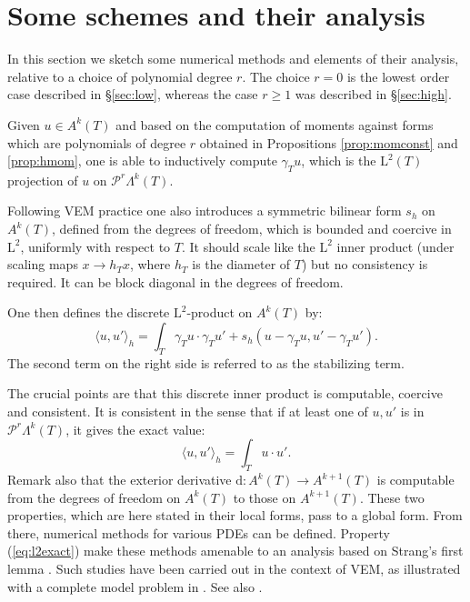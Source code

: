 \documentclass[10pt,a4paper]{article}
\newcommand{\rmd}{\mathrm{d}}
\newcommand{\rmL}{\mathrm{L}}
\newcommand{\calP}{\mathcal{P}}
\newcommand{\Poly}{\calP}
\theoremstyle{remark}
\theoremstyle{definition}
\numberwithin{equation}{section}
\begin{document}
\section{Some schemes and their analysis\label{sec:algo}}
In this section we sketch some numerical methods and elements of their analysis, relative to a choice of polynomial degree $r$. The choice $r=0$ is the lowest order case described in \S \ref{sec:low}, whereas the case $r\geq 1$ was described in \S \ref{sec:high}.

Given $u \in A^k(T)$ and based on the computation of moments against forms which are polynomials of degree $r$ obtained in Propositions \ref{prop:momconst} and \ref{prop:hmom}, one is able to inductively compute $\gamma_T u$, which is the $\rmL^2(T)$ projection of $u$ on $\Poly^r \Lambda^k (T)$.

Following VEM practice \cite{BeiBreMarRus23} one also introduces a symmetric bilinear form $s_h$ on $A^k(T)$, defined from the degrees of freedom, which is bounded and coercive in $\rmL^2$, uniformly with respect to $T$. It should scale like the $\rmL^2$ inner product (under scaling maps $x \to h_T x$, where $h_T$ is the diameter of $T$) but no consistency is required. It can be block diagonal in the degrees of freedom.

One then defines the discrete $\rmL^2$-product on $A^k(T)$ by:
\begin{equation}\label{eq:l2h}
  \langle u, u' \rangle_h = \int_T \gamma_T u \cdot \gamma_T u' + s_h( u - \gamma_T u, u' -\gamma_T u').
\end{equation}
The second term on the right side is referred to as the stabilizing term.

The crucial points are that this discrete inner product is computable, coercive and consistent. It is consistent in the sense that if at least one of $u, u'$ is in $\Poly^r \Lambda^k(T)$, it gives the exact value:
\begin{equation}\label{eq:l2exact}
\langle u , u' \rangle_h = \int_T u \cdot u'.
\end{equation}
Remark also that the exterior derivative $\rmd: A^k(T)\to A^{k+1}(T)$ is computable from the degrees of freedom on $A^k(T)$ to those on $A^{k+1}(T)$. These two properties, which are here stated in their local forms, pass to a global form. From there, numerical methods for various PDEs can be defined. Property (\ref{eq:l2exact}) make these methods amenable to an analysis based on Strang's first lemma \cite[Theorem 26.1 p. 192]{Cia91}. Such studies have been carried out in the context of VEM, as illustrated with a complete model problem in \cite[\S 3]{BeiBreMarRus23}. See also \cite{ChrHal15}.
\end{document}
